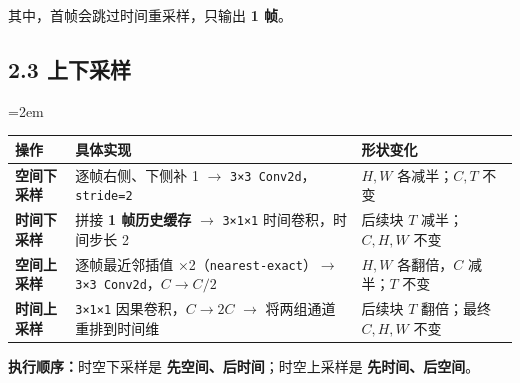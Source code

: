 \documentclass[
  11pt,
  a4paper,
  fontset=none]{ctexart}
\newcounter{none} %
\newcommand{\NotesTableStyle}{\linespread{1}\fontsize{9.5pt}{13pt}\selectfont\setlength{\tabcolsep}{4pt}\renewcommand{\arraystretch}{1.1}\setlength{\extrarowheight}{5pt}\setlength{\LTpre}{5pt}\setlength{\LTpost}{6pt}\setlength{\parskip}{0pt}\emergencystretch=2em}
\begin{document}
其中，首帧会跳过时间重采样，只输出 \textbf{1 帧}。


\subsection{2.3 上下采样}\label{wan21-sampling}

\begingroup\NotesTableStyle\fontsize{10.5pt}{14pt}\selectfont\renewcommand{\arraystretch}{1.08}\setlength{\extrarowheight}{3pt}

{\def\LTcaptype{none} %
\begin{longtable}[]{@{}
  >{\raggedright\arraybackslash}p{}
  >{\raggedright\arraybackslash}p{}
  >{\raggedright\arraybackslash}p{}@{}}
\toprule\noalign{}
\begin{minipage}[b]{\linewidth}\raggedright
操作
\end{minipage} & \begin{minipage}[b]{\linewidth}\raggedright
具体实现
\end{minipage} & \begin{minipage}[b]{\linewidth}\raggedright
形状变化
\end{minipage} \\
\midrule\noalign{}
\endhead
\bottomrule\noalign{}
\endlastfoot
\textbf{空间下采样} & 逐帧右侧、下侧补 1 \(\rightarrow\)
\texttt{3×3\ Conv2d}，\texttt{stride=2} & \(H,W\) 各减半；\(C,T\)
不变 \\
\textbf{时间下采样} & 拼接 \textbf{1 帧历史缓存} \(\rightarrow\)
\texttt{3×1×1} 时间卷积，时间步长 2 & 后续块 \(T\) 减半；\(C,H,W\)
不变 \\
\textbf{空间上采样} & 逐帧最近邻插值
×2（\texttt{nearest-exact}）\(\rightarrow\)
\texttt{3×3\ Conv2d}，\(C\rightarrow C/2\) & \(H,W\) 各翻倍，\(C\)
减半；\(T\) 不变 \\
\textbf{时间上采样} & \texttt{3×1×1} 因果卷积，\(C\rightarrow2C\)
\(\rightarrow\) 将两组通道重排到时间维 & 后续块 \(T\) 翻倍；最终
\(C,H,W\) 不变 \\
\end{longtable}
}

\endgroup

\textbf{执行顺序：}时空下采样是 \textbf{先空间、后时间}；时空上采样是
\textbf{先时间、后空间}。

\end{document}
